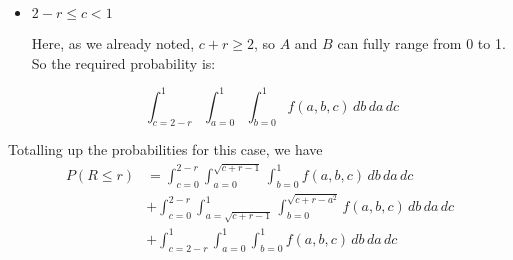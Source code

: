 \documentclass[12pt, oneside]{article}
\begin{document}
\begin{enumerate}
{\begin{enumerate}
{\begin{itemize}
{                    \begin{itemize}
                        \item {
                            \(0 < a < \sqrt{c + r - 1}\)

                            As noted above, \(B\) can range from 0 to 1, so the required probability
                            is:
                            \[
                                \int_{c = 0}^{2 - r} \int_{a=0}^{\sqrt{c + r - 1}} 
                                \int_{b = 0}^{1} f(a, b, c)\, db\, da\, dc
                            \]
                        }
                        \item {
                            \(\sqrt{c + r - 1} \leq a < 1\)

                            Here, \(c + r - a^2 \leq 1\), so \(B\) will range from 0 to
                            \(\sqrt{c + r - a^2}\). So the required probability is:
                            \[
                                \int_{c = 0}^{2 - r} \int_{a=\sqrt{c + r - 1}}^{1} 
                                \int_{b = 0}^{\sqrt{c + r - a^2}} f(a, b, c)\, db\, da\, dc
                            \]
                        }
                    \end{itemize}
                }
                \item {
                    \(2 - r \leq c < 1\)

                    Here, as we already noted, \(c + r \geq 2\), so \(A\) and \(B\) can fully
                    range from 0 to 1. So the required probability is:

                    \[
                        \int_{c = 2 - r}^{1} \int_{a=0}^{1} 
                        \int_{b = 0}^{1} f(a, b, c)\, db\, da\, dc
                    \]
                }
            \end{itemize}

            Totalling up the probabilities for this case, we have
            \begin{align*}
                P(R \leq r) &= \int_{c = 0}^{2 - r} \int_{a=0}^{\sqrt{c + r - 1}} 
                                \int_{b = 0}^{1} f(a, b, c)\, db\, da\, dc \\
                            &+ \int_{c = 0}^{2 - r} \int_{a=\sqrt{c + r - 1}}^{1} 
                                \int_{b = 0}^{\sqrt{c + r - a^2}} f(a, b, c)\, db\, da\, dc \\
                            &+ \int_{c = 2 - r}^{1} \int_{a=0}^{1} 
                                \int_{b = 0}^{1} f(a, b, c)\, db\, da\, dc
            \end{align*}
        }
    \end{enumerate}

}
\end{enumerate}
\end{document}
